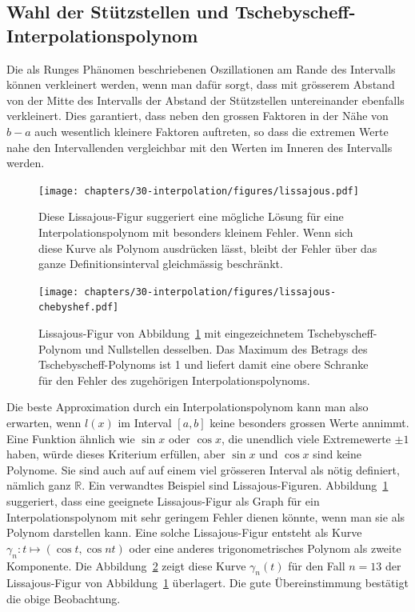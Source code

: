 %
%
\subsection{Wahl der Stützstellen und Tschebyscheff-Interpolationspolynom
\label{buch:section:interpolation:tschebyscheff}}
Die als Runges Phänomen beschriebenen Oszillationen am Rande des Intervalls
können verkleinert werden, wenn man dafür sorgt, dass
mit grösserem Abstand von der Mitte des Intervalls der Abstand der
Stützstellen untereinander ebenfalls verkleinert.
Dies garantiert, dass neben den grossen Faktoren in der Nähe von $b-a$ 
auch wesentlich kleinere Faktoren auftreten, so dass die extremen Werte
nahe den Intervallenden vergleichbar mit den Werten im Inneren des
Intervalls werden.

\begin{figure}
\centering
\texttt{[image: chapters/30-interpolation/figures/lissajous.pdf]}
\caption{Diese Lissajous-Figur suggeriert eine mögliche Lösung für eine 
Interpolationspolynom mit besonders kleinem Fehler.
Wenn sich diese Kurve als Polynom ausdrücken lässt, bleibt der Fehler über
das ganze Definitionsinterval gleichmässig beschränkt.
\label{buch:figure:lissajous}}
\end{figure}

\begin{figure}
\centering
\texttt{[image: chapters/30-interpolation/figures/lissajous-chebyshef.pdf]}
\caption{Lissajous-Figur von Abbildung~\ref{buch:figure:lissajous}
mit eingezeichnetem Tschebyscheff-Polynom und Nullstellen
desselben.
Das Maximum des Betrags des Tschebyscheff-Polynoms ist 1 und liefert 
damit eine obere Schranke für den Fehler des zugehörigen
Interpolationspolynoms.
\label{buch:figure:lissajous-chebyshef}}
\end{figure}

Die beste Approximation durch ein Interpolationspolynom kann man also
erwarten, wenn $l(x)$ im Interval $[a,b]$ keine besonders grossen Werte
annimmt.
Eine Funktion ähnlich wie $\sin x$ oder $\cos x$, die unendlich viele
Extremewerte $\pm 1$ haben, würde dieses Kriterium erfüllen, aber
$\sin x$ und $\cos x$ sind keine Polynome.
Sie sind auch auf auf einem viel grösseren Interval als nötig definiert,
nämlich ganz $\mathbb R$.
Ein verwandtes Beispiel sind Lissajous-Figuren.
Abbildung~\ref{buch:figure:lissajous} suggeriert, dass eine geeignete
Lissajous-Figur als Graph für ein Interpolationspolynom mit sehr
geringem Fehler dienen könnte, wenn man sie als Polynom darstellen kann.
Eine solche Lissajous-Figur entsteht als Kurve
$\gamma_n\colon t\mapsto (\cos t, \cos nt)$ oder eine anderes trigonometrisches
Polynom als zweite Komponente.
Die Abbildung~\ref{buch:figure:lissajous-chebyshef} zeigt diese Kurve
$\gamma_n(t)$
für den Fall $n=13$ der Lissajous-Figur von
Abbildung~\ref{buch:figure:lissajous} überlagert.
Die gute Übereinstimmung bestätigt die obige Beobachtung.

